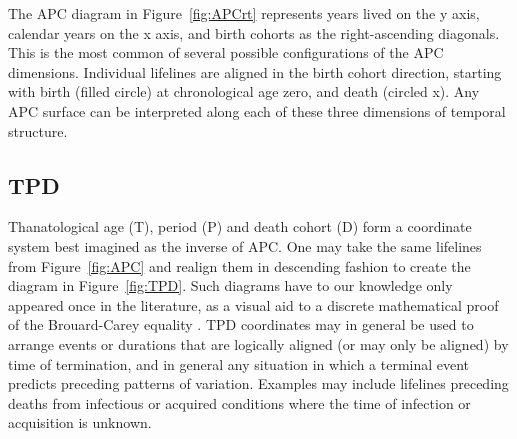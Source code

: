 \documentclass[11pt,oneside,a4paper]{article} %
\newcommand\tgh[1]{\raisebox{-.25\height}{\texttt{[image: Figures/triadtable/triad\#1.pdf]}}}
\begin{document}
The APC diagram in Figure~\ref{fig:APCrt} represents years lived on the y axis,
calendar years on the x axis, and birth cohorts as the right-ascending
diagonals. This is the most common of several possible configurations
of the APC dimensions. Individual lifelines are aligned in the birth cohort
direction, starting with birth (filled circle) at chronological age zero, and death
(circled x). Any APC surface can be interpreted along each of these
three dimensions of temporal structure. 

\FloatBarrier
\subsection*{TPD}%
\FloatBarrier
Thanatological age (T), period (P) and death cohort (D) form a coordinate system
best imagined as the inverse of APC. One may take the same lifelines from
Figure~\ref{fig:APC} and realign them in descending fashion to create the
diagram in Figure~\ref{fig:TPD}. Such diagrams have to our knowledge only
appeared once in the literature, as a visual aid to a discrete mathematical
proof of the Brouard-Carey equality
\citep{pancho2015}. TPD coordinates may in general be used to arrange events or
durations that are logically aligned (or may only be aligned) by time of
termination, and in general any
situation in which a terminal event predicts preceding patterns of variation.
Examples may include lifelines preceding deaths from infectious or acquired
conditions where the time of infection or acquisition is unknown. 
\end{document}
